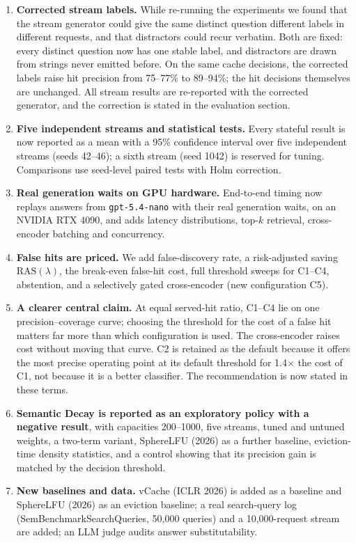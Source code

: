 \documentclass[11pt]{article}
\begin{document}
\begin{enumerate}
  \item \textbf{Corrected stream labels.} While re-running the experiments we found that the stream generator
    could give the same distinct question different labels in different requests, and that distractors could
    recur verbatim. Both are fixed: every distinct question now has one stable label, and distractors are drawn
    from strings never emitted before. On the same cache decisions, the corrected labels raise hit precision
    from 75--77\% to 89--94\%; the hit decisions themselves are unchanged. All stream results are re-reported
    with the corrected generator, and the correction is stated in the evaluation section.
  \item \textbf{Five independent streams and statistical tests.} Every stateful result is now reported as a mean
    with a 95\% confidence interval over five independent streams (seeds 42--46); a sixth stream (seed 1042) is
    reserved for tuning. Comparisons use seed-level paired tests with Holm correction.
  \item \textbf{Real generation waits on GPU hardware.} End-to-end timing now replays answers from
    \texttt{gpt-5.4-nano} with their real generation waits, on an NVIDIA RTX 4090, and adds latency distributions,
    top-$k$ retrieval, cross-encoder batching and concurrency.
  \item \textbf{False hits are priced.} We add false-discovery rate, a risk-adjusted saving
    $\mathrm{RAS}(\lambda)$, the break-even false-hit cost, full threshold sweeps for C1--C4, abstention, and a
    selectively gated cross-encoder (new configuration C5).
  \item \textbf{A clearer central claim.} At equal served-hit ratio, C1--C4 lie on one precision--coverage
    curve; choosing the threshold for the cost of a false hit matters far more than which configuration is used.
    The cross-encoder raises cost without moving that curve. C2 is retained as the default because it offers the
    most precise operating point at its default threshold for 1.4$\times$ the cost of C1, not because it is a
    better classifier. The recommendation is now stated in these terms.
  \item \textbf{Semantic Decay is reported as an exploratory policy with a negative result}, with capacities
    200--1000, five streams, tuned and untuned weights, a two-term variant, SphereLFU (2026) as a further
    baseline, eviction-time density statistics, and a control showing that its precision gain is matched by the
    decision threshold.
  \item \textbf{New baselines and data.} vCache (ICLR 2026) is added as a baseline and SphereLFU (2026) as an
    eviction baseline; a real search-query log (SemBenchmarkSearchQueries, 50,000 queries) and a
    10,000-request stream are added; an LLM judge audits answer substitutability.
\end{enumerate}
\end{document}
